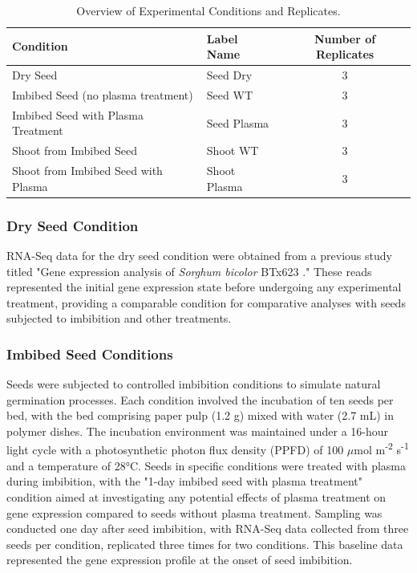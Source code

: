 \documentclass[12pt,letterpaper]{article}
\begin{document}
\begin{table}[H]
\centering
\begin{tabular}{|l|l|c|}
\hline
\textbf{Condition}                  & \textbf{Label Name} & \textbf{Number of Replicates} \\ \hline
Dry Seed                            & Seed Dry            & 3                             \\ \hline
Imbibed Seed (no plasma treatment)  & Seed WT             & 3                             \\ \hline
Imbibed Seed with Plasma Treatment  & Seed Plasma         & 3                             \\ \hline
Shoot from Imbibed Seed             & Shoot WT            & 3                             \\ \hline
Shoot from Imbibed Seed with Plasma & Shoot Plasma        & 3                             \\ \hline
\end{tabular}
\caption{Overview of Experimental Conditions and Replicates.}
\end{table}

\subsubsection{Dry Seed Condition}
RNA-Seq data for the dry seed condition were obtained from a previous study titled "Gene expression analysis of \textit{Sorghum bicolor} BTx623 \parencite{federhen2012ncbi}." These reads represented the initial gene expression state before undergoing any experimental treatment, providing a comparable condition for comparative analyses with seeds subjected to imbibition and other treatments.

\subsubsection{Imbibed Seed Conditions}
Seeds were subjected to controlled imbibition conditions to simulate natural germination processes. Each condition involved the incubation of ten seeds per bed, with the bed comprising paper pulp (1.2 g) mixed with water (2.7 mL) in polymer dishes. The incubation environment was maintained under a 16-hour light cycle with a photosynthetic photon flux density (PPFD) of 100 $\mu$mol m\textsuperscript{-2} s\textsuperscript{-1} and a temperature of 28°C. Seeds in specific conditions were treated with plasma during imbibition, with the "1-day imbibed seed with plasma treatment" condition aimed at investigating any potential effects of plasma treatment on gene expression compared to seeds without plasma treatment. Sampling was conducted one day after seed imbibition, with RNA-Seq data collected from three seeds per condition, replicated three times for two conditions. This baseline data represented the gene expression profile at the onset of seed imbibition.
\end{document}
